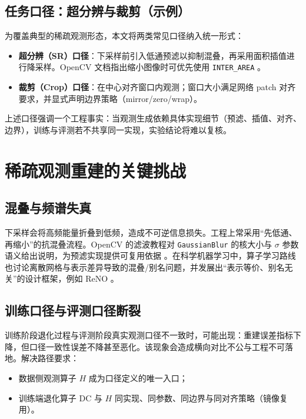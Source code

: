 \subsection{任务口径：超分辨与裁剪（示例）}

为覆盖典型的稀疏观测形态，本文将两类常见口径纳入统一形式：
\begin{itemize}
  \item \textbf{超分辨（SR）口径}：下采样前引入低通预滤以抑制混叠，再采用面积插值进行降采样。OpenCV 文档指出缩小图像时可优先使用 \texttt{INTER\_AREA} \parencite{opencv_resize}。
  \item \textbf{裁剪（Crop）口径}：在中心对齐窗口内观测；窗口大小满足网络 patch 对齐要求，并显式声明边界策略（mirror/zero/wrap）。
\end{itemize}

上述口径强调一个工程事实：当观测生成依赖具体实现细节（预滤、插值、对齐、边界），训练与评测若不共享同一实现，实验结论将难以复核。

\section{稀疏观测重建的关键挑战}

\subsection{混叠与频谱失真}

下采样会将高频能量折叠到低频，造成不可逆信息损失。工程上常采用“先低通、再缩小”的抗混叠流程。OpenCV 的滤波教程对 \texttt{GaussianBlur} 的核大小与 \(\sigma\) 参数语义给出说明，为预滤实现提供可复用依据 \parencite{opencv_gaussianblur}。在科学机器学习中，算子学习路线也讨论离散网格与表示差异导致的混叠/别名问题，并发展出“表示等价、别名无关”的设计框架，例如 ReNO \parencite{bartolucci2023reno}。

\subsection{训练口径与评测口径断裂}

训练阶段退化过程与评测阶段真实观测口径不一致时，可能出现：重建误差指标下降，但口径一致性误差不降甚至恶化。该现象会造成横向对比不公与工程不可落地。解决路径要求：
\begin{itemize}
  \item 数据侧观测算子 \(H\) 成为口径定义的唯一入口；
  \item 训练端退化算子 \(\mathrm{DC}\) 与 \(H\) 同实现、同参数、同边界与同对齐策略（镜像复用）。
\end{itemize}

